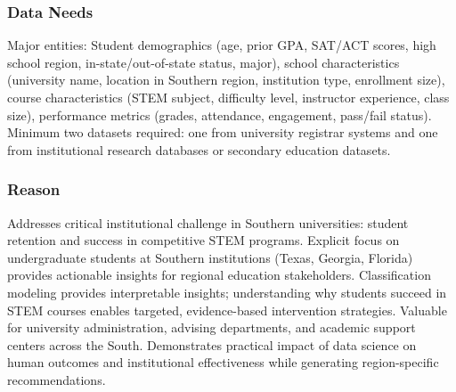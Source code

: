 \subsubsection*{Data Needs}

Major entities: Student demographics (age, prior GPA, SAT/ACT scores, high school region, in-state/out-of-state status, major), school characteristics (university name, location in Southern region, institution type, enrollment size), course characteristics (STEM subject, difficulty level, instructor experience, class size), performance metrics (grades, attendance, engagement, pass/fail status). Minimum two datasets required: one from university registrar systems and one from institutional research databases or secondary education datasets.

\subsubsection*{Reason}

Addresses critical institutional challenge in Southern universities: student retention and success in competitive STEM programs. Explicit focus on undergraduate students at Southern institutions (Texas, Georgia, Florida) provides actionable insights for regional education stakeholders. Classification modeling provides interpretable insights; understanding why students succeed in STEM courses enables targeted, evidence-based intervention strategies. Valuable for university administration, advising departments, and academic support centers across the South. Demonstrates practical impact of data science on human outcomes and institutional effectiveness while generating region-specific recommendations.



